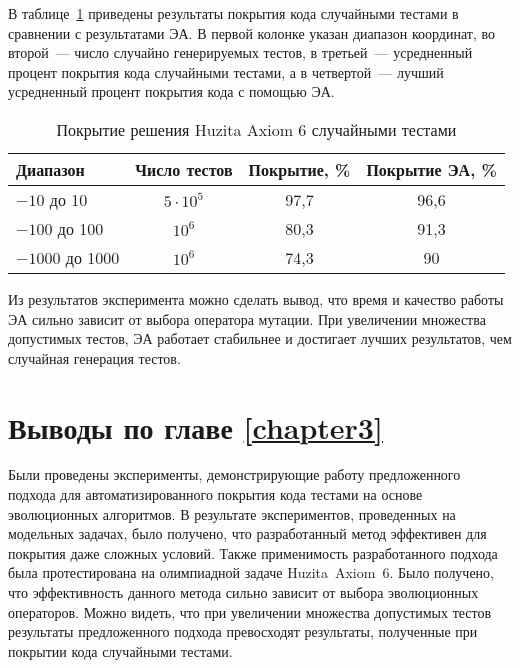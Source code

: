 В таблице~\ref{huzita_random_res} приведены результаты покрытия кода случайными тестами в сравнении с результатами ЭА. В первой колонке указан диапазон 
координат, во второй~--- число случайно генерируемых тестов, в третьей~--- усредненный процент покрытия кода случайными тестами, а в четвертой~--- лучший 
усредненный процент покрытия кода с помощью ЭА.

\begin{table}
\caption{Покрытие решения Huzita Axiom 6 случайными тестами} \label{huzita_random_res}
\begin{tabular}{|p{7em}|c|c|c|}
\hline
Диапазон &  Число тестов & Покрытие, \% & Покрытие ЭА, \%\\\hline
$-10$ до 10  & $5 \cdot 10^5$  & \cellcolor{purpur}97,7  & 96,6 \\\hline
$-100$ до 100 & $10^6$  &  80,3 & \cellcolor{purpur}91,3 \\\hline
$-1000$ до 1000  & $10^6$  & 74,3 & \cellcolor{purpur}90 \\\hline
\end{tabular}
\end{table}

Из результатов эксперимента можно сделать вывод, что время и качество работы ЭА сильно зависит от выбора оператора мутации. При увеличении множества допустимых 
тестов, ЭА работает стабильнее и достигает лучших результатов, чем случайная генерация тестов.

\section{Выводы по главе \ref{chapter3}}
Были проведены эксперименты, демонстрирующие работу предложенного подхода для автоматизированного покрытия кода тестами на основе эволюционных алгоритмов. В 
результате экспериментов, проведенных на модельных задачах, было получено, что разработанный метод эффективен для покрытия даже сложных условий. Также 
применимость разработанного подхода была протестирована на олимпиадной задаче Huzita~Axiom~6. Было получено, что эффективность данного метода сильно зависит от 
выбора эволюционных операторов. Можно видеть, что при увеличении множества допустимых тестов результаты предложенного подхода превосходят результаты, 
полученные при покрытии кода случайными тестами.
